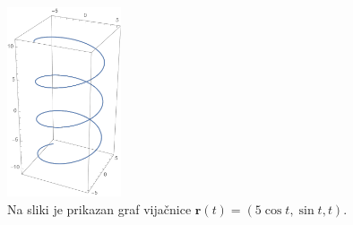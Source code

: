 \documentclass[12pt,a4paper,twoside]{article}
\theoremstyle{definition} %
\theoremstyle{plain} %
\theoremstyle{primerstyle}
\numberwithin{equation}{section}  %
\newcommand{\rV}{\mathbf{r}}
\begin{document}
\begin{figure}[h!]
	  \centering
	  \includegraphics[width=0.3\textwidth]{images/simple_helix.pdf}
	  \caption[Primer preposte vijačnice]{Na sliki je prikazan graf vijačnice $\rV(t)=(5\cos{t},\sin{t},t).$}
	  \label{fig:simple_helix}
	\end{figure}
\end{document}
